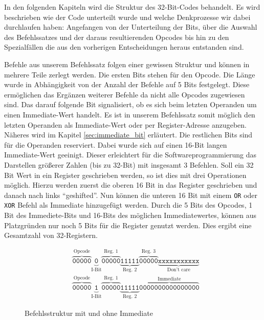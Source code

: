 \documentclass[paper=a4,fontsize=12pt,twocolumn]{scrreprt}
\begin{document}
In den folgenden Kapiteln wird die Struktur des 32-Bit-Codes behandelt.
Es wird beschrieben wie der Code unterteilt wurde und welche Denkprozesse wir dabei durchlaufen haben:
Angefangen von der Unterteilung der Bits, über die Auswahl des Befehlssatzes und der daraus resultierenden Opcodes bis hin zu den Spezialfällen die aus den vorherigen Entscheidungen heraus entstanden sind.

Befehle aus unserem Befehlssatz folgen einer gewissen Struktur und können in mehrere Teile zerlegt werden.
Die ersten Bits stehen für den Opcode.
Die Länge wurde in Abhängigkeit von der Anzahl der Befehle auf 5 Bits festgelegt.
Diese ermöglichen das Ergänzen weiterer Befehle da nicht alle Opcodes zugewiesen sind.
Das darauf folgende Bit signalisiert, ob es sich beim letzten Operanden um einen Immediate-Wert handelt.
Es ist in unserem Befehlssatz somit möglich den letzten Operanden als Immediate-Wert oder per Register-Adresse anzugeben.
Näheres wird im Kapitel \ref{sec:immediate_bit} erläutert.
Die restlichen Bits sind für die Operanden reserviert.
Dabei wurde sich auf einen 16-Bit langen Immediate-Wert geeinigt.
Dieser erleichtert für die Softwareprogrammierung das Darstellen größerer Zahlen (bis zu 32-Bit) mit insgesamt 3 Befehlen.
Soll ein 32 Bit Wert in ein Register geschrieben werden, so ist dies mit drei Operationen möglich.
Hierzu werden zuerst die oberen 16 Bit in das Register geschrieben und danach nach links \enquote{geshifted}. Nun können die unteren 16 Bit mit einem \texttt{OR} oder \texttt{XOR} Befehl als Immediate hinzugefügt werden.
Durch die 5 Bits des Opcodes, 1 Bit des Immediete-Bits und 16-Bits des möglichen Immediatewertes, können aus Platzgründen nur noch 5 Bits für die Register genutzt werden.
Dies ergibt eine Gesamtzahl von 32-Registern.

\begin{figure*}[t]
\centering
\begin{align*}
&\overbrace{\texttt{00000}}^\text{Opcode}
\underbrace{\texttt{0}}_\text{I-Bit}
\overbrace{\texttt{00000}}^\text{Reg. 1}
\underbrace{\texttt{11111}}_\text{Reg. 2}
\overbrace{\texttt{00000}}^\text{Reg. 3}
\underbrace{\texttt{xxxxxxxxxxx}}_\text{Don't care}\\ 
&\overbrace{\texttt{00000}}^\text{Opcode}
\underbrace{\texttt{1}}_\text{I-Bit}
\overbrace{\texttt{00000}}^\text{Reg. 1}
\underbrace{\texttt{11111}}_\text{Reg. 2}
\overbrace{\texttt{0000000000000000}}^\text{Immediate} 
\end{align*}
\caption{Befehlsstruktur mit und ohne Immediate}
\label{fig:Befehlsstruktur}
\end{figure*}
\end{document}
